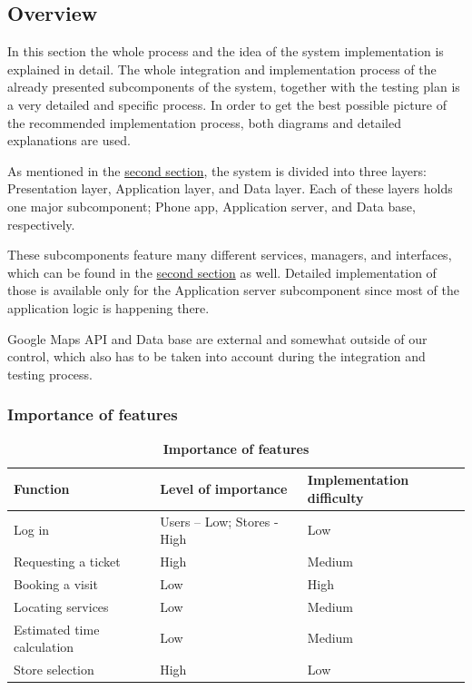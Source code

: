 \subsection{Overview}

In this section the whole process and the idea of the system implementation is explained in detail. The whole integration and implementation process of the already presented subcomponents of the system,  together with the testing plan is a very detailed and specific process. In order to get the best possible picture of the recommended implementation process, both diagrams and detailed explanations are used. \newline

As mentioned in the \hyperlink{section.2}{second section}, the system is divided into three layers: Presentation layer, Application layer, and Data layer. Each of these layers holds one major subcomponent; Phone app, Application server, and Data base, respectively.  \newline

 

These subcomponents feature many different services, managers, and interfaces, which can be found in the \hyperlink{section.2}{second section} as well. Detailed implementation of those is available only for the Application server subcomponent since most of the application logic is happening there. \newline

 

Google Maps API and Data base are external and somewhat outside of our control, which also has to be taken into account during the integration and testing process.  


\subsubsection{Importance of features}

\begin{table}[H]
\begin{flushleft}
\begin{tabular}{|l|l|l|}
\hline
\textbf{Function }& \textbf{Level of importance} & \textbf{Implementation difficulty} \\
\hline
Log in & Users – Low; Stores - High & Low \\
\hline
Requesting a ticket & High & Medium \\
\hline
Booking a visit & Low & High \\
\hline
Locating services & Low & Medium \\
\hline
Estimated time calculation & Low & Medium \\
\hline
Store selection & High & Low  \\
\hline
\end{tabular}
\end{flushleft}
\caption{\textbf{Importance of features}}
\label{tab:feat1}
\end{table}


